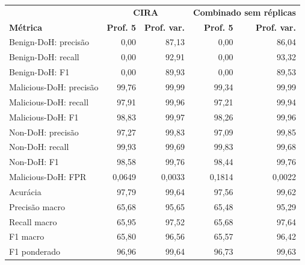 \begin{tabular}{lrrrr}
\hline
\multicolumn{1}{c}{\textbf{}} & \multicolumn{2}{c}{\textbf{CIRA}} & \multicolumn{2}{c}{\textbf{Combinado sem réplicas}} \\
\textbf{Métrica} & \textbf{Prof. 5} & \textbf{Prof. var.} & \textbf{Prof. 5} & \textbf{Prof. var.} \\ \hline
Benign-DoH: precisão & 0,00 & 87,13 & 0,00 & 86,04 \\
Benign-DoH: recall & 0,00 & 92,91 & 0,00 & 93,32 \\
Benign-DoH: F1 & 0,00 & 89,93 & 0,00 & 89,53 \\
Malicious-DoH: precisão & 99,76 & 99,99 & 99,34 & 99,99 \\
Malicious-DoH: recall & 97,91 & 99,96 & 97,21 & 99,94 \\
Malicious-DoH: F1 & 98,83 & 99,97 & 98,26 & 99,96 \\
Non-DoH: precisão & 97,27 & 99,83 & 97,09 & 99,85 \\
Non-DoH: recall & 99,93 & 99,69 & 99,83 & 99,68 \\
Non-DoH: F1 & 98,58 & 99,76 & 98,44 & 99,76 \\
Malicious-DoH: FPR & 0,0649 & 0,0033 & 0,1814 & 0,0022 \\
\hline
Acurácia & 97,79 & 99,64 & 97,56 & 99,62 \\
Precisão macro & 65,68 & 95,65 & 65,48 & 95,29 \\
Recall macro & 65,95 & 97,52 & 65,68 & 97,64 \\
F1 macro & 65,80 & 96,56 & 65,57 & 96,42 \\
F1 ponderado & 96,96 & 99,64 & 96,73 & 99,63 \\
\hline
\end{tabular}
